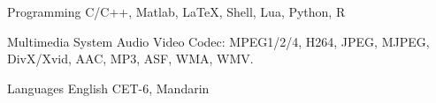 

\begin{cvskills}

  \cvskill
    {Programming} %
    {C/C++, Matlab, LaTeX, Shell, Lua, Python, R} %

  \cvskill
    {Multimedia System} %
    {Audio Video Codec: MPEG1/2/4, H264, JPEG, MJPEG, DivX/Xvid, AAC, MP3, ASF, WMA, WMV.} %

  \cvskill
    {Languages} %
    {English CET-6, Mandarin} %

\end{cvskills}
